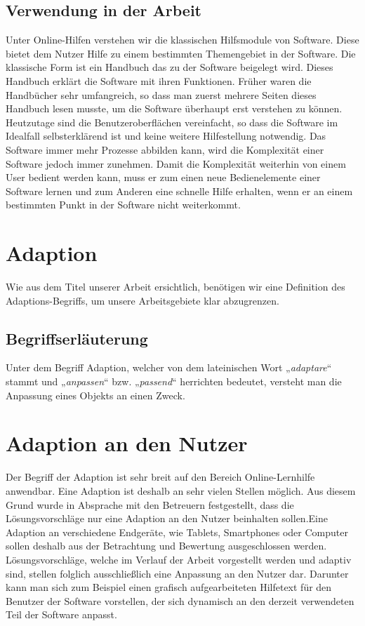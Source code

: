 \subsection{Verwendung in der Arbeit}
Unter Online-Hilfen verstehen wir die klassischen Hilfsmodule von Software. Diese bietet dem Nutzer Hilfe zu einem bestimmten Themengebiet in der Software. Die klassische Form ist ein Handbuch das zu der Software beigelegt wird. Dieses Handbuch erklärt die Software mit ihren Funktionen. Früher waren die Handbücher sehr umfangreich, so dass man zuerst mehrere Seiten dieses Handbuch lesen musste, um die Software überhaupt erst verstehen zu können. Heutzutage sind die Benutzeroberflächen vereinfacht, so dass die Software im Idealfall selbsterklärend ist und keine weitere Hilfestellung notwendig. Das Software immer mehr Prozesse abbilden kann, wird die Komplexität einer Software jedoch immer zunehmen. Damit die Komplexität weiterhin von einem User bedient werden kann, muss er zum einen neue Bedienelemente einer Software lernen und zum Anderen eine schnelle Hilfe erhalten, wenn er an einem bestimmten Punkt in der Software nicht weiterkommt.

\section{Adaption}
\label{ch:Content1}
Wie aus dem Titel unserer Arbeit ersichtlich, benötigen wir eine Definition des Adaptions-Begriffs, um unsere Arbeitsgebiete klar abzugrenzen.

\subsection{Begriffserläuterung}
Unter dem Begriff Adaption, welcher von dem lateinischen Wort „\textit{adaptare}“ stammt und „\textit{anpassen}“ bzw. „\textit{passend}“ herrichten \cite{dud3} bedeutet, versteht man die Anpassung eines Objekts an einen Zweck. 

\section{Adaption an den Nutzer}
Der Begriff der Adaption ist sehr breit auf den Bereich Online-Lernhilfe anwendbar. Eine Adaption ist deshalb an sehr vielen Stellen möglich. Aus diesem Grund wurde in Absprache mit den Betreuern festgestellt, dass die Lösungsvorschläge nur eine Adaption an den Nutzer beinhalten sollen.Eine Adaption an verschiedene Endgeräte, wie Tablets, Smartphones oder Computer sollen deshalb aus der Betrachtung und Bewertung ausgeschlossen werden. Lösungsvorschläge, welche im Verlauf der Arbeit vorgestellt werden und adaptiv sind, stellen folglich ausschließlich eine Anpassung an den Nutzer dar. Darunter kann man sich zum Beispiel einen grafisch aufgearbeiteten Hilfetext für den Benutzer der Software vorstellen, der sich dynamisch an den derzeit verwendeten Teil der Software anpasst.

